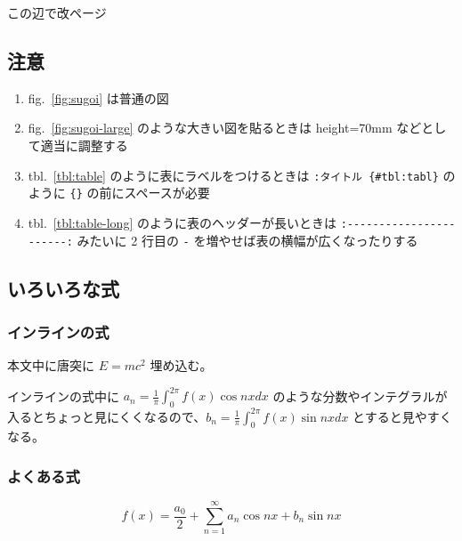 この辺で改ページ \clearpage

\hypertarget{ux6ce8ux610f}{%
\subsection{注意}\label{ux6ce8ux610f}}

\begin{enumerate}
\def\labelenumi{\arabic{enumi}.}


\item
  fig.~\ref{fig:sugoi} は普通の図
\item
  fig.~\ref{fig:sugoi-large} のような大きい図を貼るときは height=70mm
  などとして適当に調整する
\item
  tbl.~\ref{tbl:table} のように表にラベルをつけるときは
  \texttt{:タイトル\ \{\#tbl:tabl\}} のように \texttt{\{\}}
  の前にスペースが必要
\item
  tbl.~\ref{tbl:table-long} のように表のヘッダーが長いときは
  \texttt{:-\/-\/-\/-\/-\/-\/-\/-\/-\/-\/-\/-\/-\/-\/-\/-\/-\/-\/-\/-\/-\/-\/-:}
  みたいに 2 行目の \texttt{-} を増やせば表の横幅が広くなったりする
\end{enumerate}

\hypertarget{ux3044ux308dux3044ux308dux306aux5f0f}{%
\subsection{いろいろな式}\label{ux3044ux308dux3044ux308dux306aux5f0f}}

\hypertarget{ux30a4ux30f3ux30e9ux30a4ux30f3ux306eux5f0f}{%
\subsubsection{インラインの式}\label{ux30a4ux30f3ux30e9ux30a4ux30f3ux306eux5f0f}}

本文中に唐突に \(E = mc^2\) 埋め込む。

インラインの式中に
\(a_n = \frac{1}{\pi} \int_{0}^{2\pi} f(x) \cos nx dx\)
のような分数やインテグラルが入るとちょっと見にくくなるので、\(\displaystyle b_n = \frac{1}{\pi} \int_{0}^{2\pi} f(x) \sin nx dx\)
とすると見やすくなる。

\hypertarget{ux3088ux304fux3042ux308bux5f0f}{%
\subsubsection{よくある式}\label{ux3088ux304fux3042ux308bux5f0f}}

\begin{equation}f(x) = \frac{a_0}{2} + \sum_{n = 1}^{\infty} a_n \cos nx + b_n \sin nx\label{eq:fourier}\end{equation}

